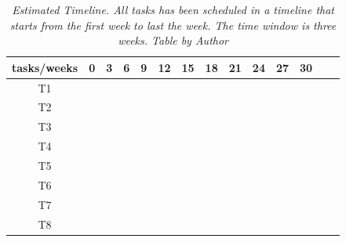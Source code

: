 \begin{table}[H]
  \centering
  \label{tab:340W}
  \begin{tabular}{| c | c | c | c |c | c | c |c | c | c |c | c | c |c | }
    \hline
    tasks/weeks & 0 & 3 & 6 & 9 & 12 & 15 & 18 & 21 & 24 & 27 & 30 \\
    \hline
    T1  & \cellcolor{red!50} &   &   &   &   &   &   &   &   &   &     \\
    \hline
    T2  &   & \cellcolor{lime!50}  &  &  &   &   &   &    &  &  &   \\
    \hline
    T3  &  &  & \cellcolor{blue!40} &  &   &   &   &   &  &  & \\
    \hline
    T4  &  &  &  & \cellcolor{teal!50} & \cellcolor{teal!50} &  &  &   &   &   &   \\
    \hline
    T5  &  &  &  &  & \cellcolor{amber!30} & \cellcolor{amber!30} & \cellcolor{amber!30}  & \cellcolor{amber!30} & \cellcolor{amber!30}  &  & \\
    \hline
    T6  &  &  &  &  & \cellcolor{black!70} & \cellcolor{black!70} & \cellcolor{black!70}  & \cellcolor{black!70} & \cellcolor{black!70}  &  \cellcolor{black!70} & \\
    \hline
    T7  &   &  &  &  &  &  &  &   &    & \cellcolor{gray!50} & \\
    \hline
    T8  &   &  &  &  &  & \cellcolor{orange!50}  &  &   &   & \cellcolor{orange!50} & \cellcolor{orange!50} \\
    \hline
  \end{tabular}
  \caption[Estimated Timeline.]
  {\textit{Estimated Timeline.
  All tasks has been scheduled in a timeline that starts from the first week to last the week.
  The time window is three weeks.
  Table by Author}}
\end{table}
